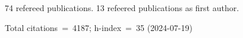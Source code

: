 74 refereed publications. 13 refeered publications as first author.

Total citations~=~4187; h-index~=~35 (2024-07-19)